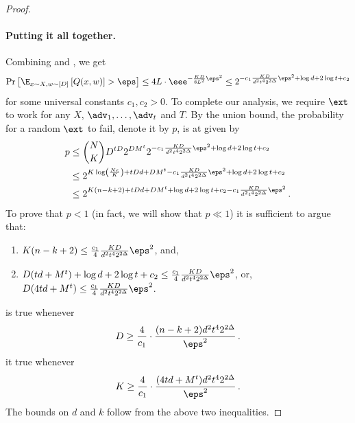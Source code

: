 \documentclass{toc}
\begin{document}
\begin{proof}
\paragraph*{Putting it all together.}   %
Combining  and , we get
\[
\Pr\left[\E_{x \sim X,w \sim [D]}\left[ Q(x,w) \right] > \eps\right] \le 4L \cdot
\eee^{-\frac{KD}{8L^2}\eps^2}
\le 2^{-c_{1}\frac{KD}{d^{2}t^{4}2^{2\Delta}}\eps^{2}+\log d + 2\log t + c_2}
\]
for some universal constants $c_1,c_2 > 0$. To complete our analysis, we require $\ext$
to work for any $X$, $\adv_1,\ldots,\adv_t$ and $T$. By the union bound, the probability
for a random $\ext$ to fail, denote it by $p$, is at given by
\begin{align*}
p &\le \binom{N}{K}D^{tD}2^{DM^t}2^{-c_{1}\frac{KD}{d^{2}t^{4}2^{2\Delta}}\eps^{2}+\log d + 2\log t + c_2} \\
&\le 2^{K\log\left( \frac{Ne}{K} \right) + tDd + DM^t - c_{1}\frac{KD}{d^{2}t^{4}2^{2\Delta}}\eps^{2}+\log d + 2\log t + c_2} \\
&\le 2^{K(n-k+2)+tDd+DM^t +\log d +2\log t + c_2 - c_{1}\frac{KD}{d^{2}t^{4}2^{2\Delta}}\eps^{2}}\,.
\end{align*}
To prove that $p < 1$ (in fact, we will show that $p \ll 1$) it is sufficient to argue that:
\begin{enumerate}
\item\label{eq:prob1}  $K(n-k+2) \le \frac{c_1}{4}\frac{KD}{d^{2}t^{4}2^{2\Delta}}\eps^{2}$, and,
\item\label{eq:prob2}  $D(td+M^t) +\log d +2\log t + c_2  \le \frac{c_1}{4}\frac{KD}{d^{2}t^{4}2^{2\Delta}}\eps^{2}$, or, $D(4td+M^t) \le \frac{c_1}{4}\frac{KD}{d^{2}t^{4}2^{2\Delta}}\eps^{2}$.
\end{enumerate}
 is true whenever 
\[
D \ge \frac{4}{c_1} \cdot \frac{(n-k+2)d^{2}t^{4}2^{2\Delta}}{\eps^2}\,.
\]
 it true whenever
\[
K \ge \frac{4}{c_1} \cdot \frac{(4td+M^t)d^{2}t^{4}2^{2\Delta}}{\eps^2}\,.
\]
The bounds on $d$ and $k$ follow from the above two inequalities.
\end{proof}







%
%
%
%

\end{document}
